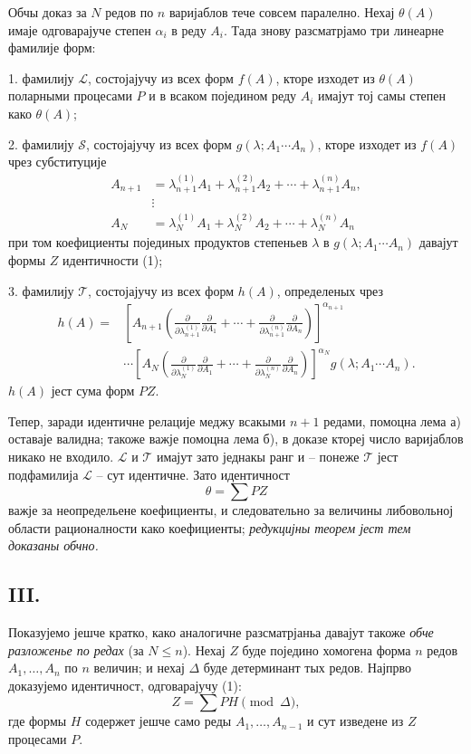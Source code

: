 \documentclass[11pt]{article}
\providecommand{\vdotswithin}[1]{\mathrel{\vdots}}
\begin{document}
Обчы доказ за $N$ редов по $n$ варијаблов тече совсем паралелно. Нехај $\theta(A)$ имаје одговарајуче степен $\alpha_i$ в реду $A_i$. Тада знову разсматрјамо три линеарне фамилије форм:

1. фамилију $\mathcal L$, состојајучу из всех форм $f(A)$, кторе изходет из $\theta(A)$ поларными процесами $P$ и в всаком поједином реду $A_i$ имајут тој самы степен како $\theta(A)$;

2. фамилију $\mathcal S$, состојајучу из всех форм $g(\lambda;A_1\cdots A_n)$, кторе изходет из $f(A)$ чрез субституције
\[
\begin{aligned}
 A_{n+1}&=\lambda_{n+1}^{(1)}A_1+\lambda_{n+1}^{(2)}A_2+
        \cdots+\lambda_{n+1}^{(n)}A_n,\\
 &\vdotswithin{=}\\
 A_N&=\lambda_N^{(1)}A_1+\lambda_N^{(2)}A_2+
        \cdots+\lambda_N^{(n)}A_n
\end{aligned}
\]
при том коефициенты појединых продуктов степеньев $\lambda$ в $g(\lambda;A_1\cdots A_n)$ давајут формы $Z$ идентичности (1);

3. фамилију $\mathcal T$, состојајучу из всех форм $h(A)$, определеных чрез
\[
\begin{aligned}
 h(A)=&\left[A_{n+1}\left(
 \frac{\partial}{\partial\lambda_{n+1}^{(1)}}\frac{\partial}{\partial A_1}
 +\cdots+
 \frac{\partial}{\partial\lambda_{n+1}^{(n)}}\frac{\partial}{\partial A_n}\right)\right]^{\alpha_{n+1}} \\
&\cdots
\left[A_N\left(
 \frac{\partial}{\partial\lambda_N^{(1)}}\frac{\partial}{\partial A_1}
 +\cdots+
 \frac{\partial}{\partial\lambda_N^{(n)}}\frac{\partial}{\partial A_n}\right)\right]^{\alpha_N}
 g(\lambda;A_1\cdots A_n).
\end{aligned}
\]
$h(A)$ јест сума форм $PZ$.

Тепер, заради идентичне релације меджу всакыми $n+1$ редами, помоцна лема а) оставаје валидна; такоже важје помоцна лема б), в доказе ктореј число варијаблов никако не входило. $\mathcal L$ и $\mathcal T$ имајут зато једнакы ранг и -- понеже $\mathcal T$ јест подфамилија $\mathcal L$ -- сут идентичне. Зато идентичност
\[
  \theta=\sum PZ
\]
важје за неопредельене коефициенты, и следовательно за величины либовольној области рационалности како коефициенты; {\itshape редукцијны теорем јест тем доказаны обчно.}

\subsection*{III.}
Показујемо јешче кратко, како аналогичне разсматрјаньа давајут такоже {\itshape обче разложенье по редах} (за $N\le n$). Нехај $Z$ буде поједино хомогена форма $n$ редов $A_1,\ldots,A_n$ по $n$ величин; и нехај $\Delta$ буде детерминант тых редов. Најпрво доказујемо идентичност, одговарајучу (1):
\begin{equation}
  Z=\sum PH \pmod{\Delta},
\tag{2}
\end{equation}
где формы $H$ содержет јешче само реды $A_1,\ldots,A_{n-1}$ и сут изведене из $Z$ процесами $P$.
\end{document}
